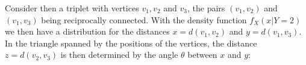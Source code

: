 \begin{figure}[H]
  \vspace{1.2cm}
  \centering
\end{figure}

Consider then a triplet with vertices $v_1, v_2$ and $v_3$, the pairs
$(v_1,v_2)$ and $(v_1, v_3)$ being reciprocally connected. With the
density function $f_X(x|Y=2)$ we then have a distribution for the
distances $x = d(v_1, v_2)$ and $y = d(v_1,v_3)$. In the triangle
spanned by the positions of the vertices, the distance $z=d(v_2,v_3)$
is then determined by the angle $\theta$ between $x$ and $y$:


